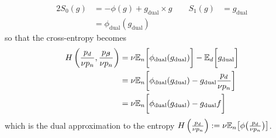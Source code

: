 %
\begin{alignat*}{2}
    S_0(g) 
    & = 
    -\phi(g) + g_{\mathrm{dual}} \times g  
    \hspace{2em}
    S_1(g) 
    & = 
    g_{\mathrm{dual}} 
    \\
    {}
    & = 
    \phi_{\mathrm{dual}}(g_{\mathrm{dual}})
\end{alignat*}
%
so that the cross-entropy becomes
%
\begin{align*}
    H \left( 
    \frac{{\color{black} p_d}}{\nu {\color{black} p_n}}
    ,
    \frac{p_{{\bm{\beta}}}}{\nu {\color{black} p_n}}
    \right) 
    & =
    \nu \mathbb{E}_n
    \bigg[
    \phi_{\mathrm{dual}}(g_{\mathrm{dual}})
    \bigg]
    -
    \mathbb{E}_d
    \bigg[
    g_{\mathrm{dual}} 
    \bigg]
    \\
    & =
    \nu \mathbb{E}_n
    \bigg[
    \phi_{\mathrm{dual}}(g_{\mathrm{dual}})
    -
    g_{\mathrm{dual}} 
    \frac{{\color{black} p_d}}{\nu {\color{black} p_n}}
    \bigg]
    \\
    & =
    \nu \mathbb{E}_n
    \bigg[
    \phi_{\mathrm{dual}}(g_{\mathrm{dual}})
    -
    g_{\mathrm{dual}} 
    f
    \bigg]
\end{align*}
%
which is the dual approximation to the entropy $H \left( 
\frac{{\color{black} p_d}}{\nu {\color{black} p_n}} 
\right) 
:=
\nu \mathbb{E}_n
\big[
\phi
\big(
\frac{{\color{black} p_d}}{\nu {\color{black} p_n}}
\big)
\big]$.
